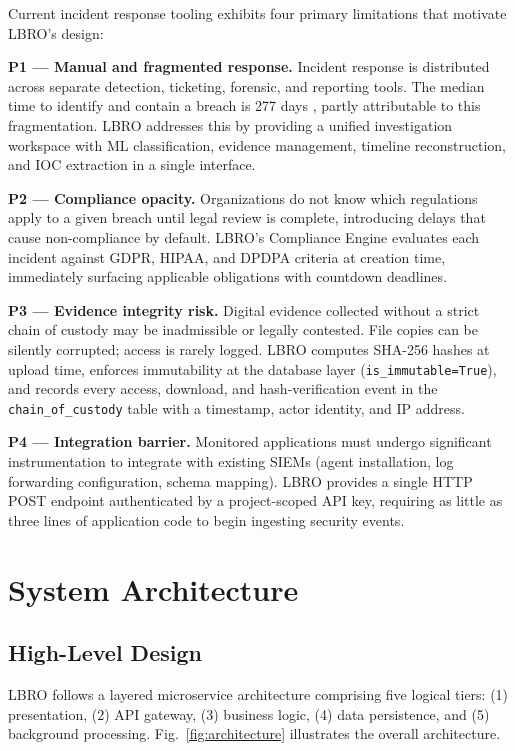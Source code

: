 \documentclass[conference]{IEEEtran}
\begin{document}
Current incident response tooling exhibits four primary limitations that motivate LBRO's design:

\textbf{P1 — Manual and fragmented response.} Incident response is distributed across separate detection, ticketing, forensic, and reporting tools. The median time to identify and contain a breach is 277 days \cite{ibm2022cost}, partly attributable to this fragmentation. LBRO addresses this by providing a unified investigation workspace with ML classification, evidence management, timeline reconstruction, and IOC extraction in a single interface.

\textbf{P2 — Compliance opacity.} Organizations do not know which regulations apply to a given breach until legal review is complete, introducing delays that cause non-compliance by default. LBRO's Compliance Engine evaluates each incident against GDPR, HIPAA, and DPDPA criteria at creation time, immediately surfacing applicable obligations with countdown deadlines.

\textbf{P3 — Evidence integrity risk.} Digital evidence collected without a strict chain of custody may be inadmissible or legally contested. File copies can be silently corrupted; access is rarely logged. LBRO computes SHA-256 hashes at upload time, enforces immutability at the database layer (\texttt{is\_immutable=True}), and records every access, download, and hash-verification event in the \texttt{chain\_of\_custody} table with a timestamp, actor identity, and IP address.

\textbf{P4 — Integration barrier.} Monitored applications must undergo significant instrumentation to integrate with existing SIEMs (agent installation, log forwarding configuration, schema mapping). LBRO provides a single HTTP POST endpoint authenticated by a project-scoped API key, requiring as little as three lines of application code to begin ingesting security events.

\section{System Architecture}

\subsection{High-Level Design}

LBRO follows a layered microservice architecture comprising five logical tiers: (1) presentation, (2) API gateway, (3) business logic, (4) data persistence, and (5) background processing. Fig.~\ref{fig:architecture} illustrates the overall architecture.
\end{document}
